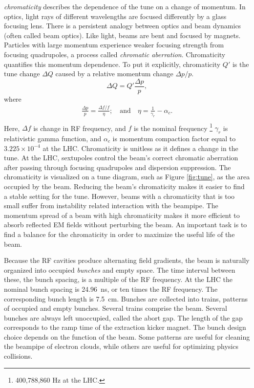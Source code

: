 \emph{ chromaticity} describes the dependence of the tune on a change of momentum.
In optics, light rays of different wavelengths are focused differently by a glass focusing lens.
There is a persistent analogy between optics and beam dynamics (often called beam optics). Like light, beams are bent and focused by magnets. 
Particles with large momentum experience weaker focusing strength from focusing quadrupoles, a process called \emph{chromatic aberration}.
Chromaticity quantifies this momentum dependence.
To put it explicitly, chromaticity $Q'$ is the tune change $\Delta Q$ caused by a relative momentum change $\Delta p/p$. \cite{fuchsberger}
\begin{equation}
    \Delta Q = Q'\frac{\Delta p}{p},
\end{equation}
where
\begin{equation}
\begin{split}
    \frac{\Delta p}{p} = \frac{\Delta f/f}{\eta}; \quad\text{and}\quad \eta = \frac{1}{\gamma_r}-\alpha_c. \\
\end{split}
\end{equation}
Here, $\Delta f$ is change in RF frequency, and $f$ is the nominal frequency \footnote{400,788,860 Hz at the LHC.} 
$\gamma_r$ is relativistic gamma function, and $\alpha_c$ is momentum compaction factor equal to $3.225\times10^{-4}$ at the LHC.
Chromaticity is unitless as it defines a change in the tune.
At the LHC, sextupoles control the beam's correct chromatic aberration after passing through focusing quadrupoles and dispersion suppression. \cite{frascati} \cite{bruno}
The chromaticity is visualized on a tune diagram, such as Figure \ref{fig:tune}, as the area occupied by the beam.
Reducing the beam's chromaticity makes it easier to find a stable setting for the tune.
However, beams with a chromaticity that is too small suffer from instability related interaction with the beampipe.
The momentum spread of a beam with high chromaticity makes it more efficient to absorb reflected EM fields without perturbing the beam.
An important task is to find a balance for the chromaticity in order to maximize the useful life of the beam.

Because the RF cavities produce alternating field gradients, the beam is naturally organized into occupied \emph{bunches} and empty space.
The time interval between these, the bunch spacing, is a multiple of the RF frequency.
At the LHC the nominal bunch spacing is 24.96~ns, or ten times the RF frequency. The corresponding bunch length is 7.5~cm. \cite{boussard}
Bunches are collected into trains, patterns of occupied and empty bunches.
Several trains comprise the beam.
Several bunches are always left unoccupied, called the abort gap. The length of the gap corresponds to the ramp time of the extraction kicker magnet.
The bunch design choice depends on the function of the beam. Some patterns are useful for cleaning the beampipe of electron clouds, while others are useful for optimizing physics collisions.


